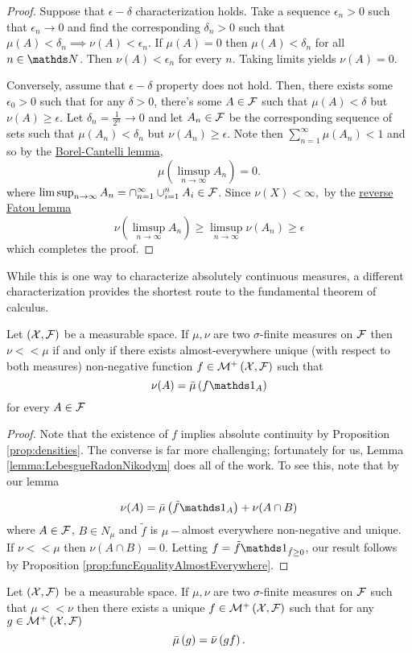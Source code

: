 \begin{proof}
Suppose that $\epsilon-\delta$ characterization holds. Take a sequence
$\epsilon_{n}>0$ such that $\epsilon_{n}\to0$ and find the corresponding
$\delta_{n}>0$ such that $\mu(A)<\delta_{n}\implies\nu(A)<\epsilon_{n}$.
If $\mu(A)=0$ then $\mu(A)<\delta_{n}$ for all $n\in\N$. Then $\nu(A)<\epsilon_{n}$
for every $n.$ Taking limits yields $\nu(A)=0.$

Conversely, assume that $\epsilon-\delta$ property does not hold.
Then, there exists some $\epsilon_{0}>0$ such that for any $\delta>0$,
there's some $A\in\mathcal{F}$ such that $\mu(A)<\delta$ but $\nu(A)\geq\epsilon$.
Let $\delta_{n}=\frac{1}{2^{n}}\to0$ and let $A_{n}\in\mathcal{F}$ be the
corresponding sequence of sets such that $\mu(A_{n})<\delta_{n}$
but $\nu(A_{n})\geq\epsilon.$ Note then $\sum_{n=1}^{\infty}\mu(A_{n})<1$
and so by the \hyperref[thm:borelCantelli]{Borel-Cantelli lemma},
\[
\mu(\limsup_{n\to\infty}A_{n})=0.
\]
where $\limsup_{n\to\infty}A_{n}=\cap_{n=1}^{\infty}\cup_{i=1}^{n}A_{i}\in\mathcal{F}$.
Since $\nu(X)<\infty,$ by the \hyperref[cor:reverseFatouLemma]{reverse Fatou lemma}
\[
\nu(\limsup_{n\to\infty}A_n)\geq\limsup_{n\to\infty}\nu(A_{n})\geq\epsilon
\]
which completes the proof.
\end{proof}
While this is one way to characterize absolutely continuous measures,
a different characterization provides the shortest route to the fundamental
theorem of calculus.
\begin{thm}
\label{thm:radonNikodym}Let $\left(\mathcal{X},\mathcal{F}\right)$ be a measurable
space. If $\mu,\nu$ are two $\sigma$-finite measures on $\mathcal{F}$ then
$\nu<<\mu$ if and only if there exists almost-everywhere unique (with
respect to both measures) non-negative function $f\in\mathcal{M}^{+}\left(\mathcal{X},\mathcal{F}\right)$
such that 
\[
\nu(A)=\lebInt{\mu}{f\indicate_{A}}
\]
for every $A\in\mathcal{F}$
\end{thm}

\begin{proof}
Note that the existence of $f$ implies absolute continuity by Proposition
\ref{prop:densities}. The converse is far more challenging; fortunately
for us, Lemma \ref{lemma:LebesgueRadonNikodym} does all of the work.
To see this, note that by our lemma

\[
\nu(A)=\lebInt{\mu}{\tilde{f}\indicate_{A}}+\nu(A\cap B)
\]
where $A\in\mathcal{F}$, $B\in N_{\mu}$ and $\tilde{f}$ is $\mu-$almost
everywhere non-negative and unique. If $\nu<<\mu$ then $\nu(A\cap B)=0$.
Letting $f=\tilde{f}\indicate_{{\tilde{f}\geq0}}$, our result follows
by Proposition \ref{prop:funcEqualityAlmostEverywhere}.
\end{proof}
\begin{cor}
\label{cor:radonNikodymIntegral}Let $\left(\mathcal{X},\mathcal{F}\right)$ be a measurable
space. If $\mu,\nu$ are two $\sigma$-finite measures on $\mathcal{F}$ such
that $\mu<<\nu$ then there exists a unique $f\in\mathcal{M}^{+}\left(\mathcal{X},\mathcal{F}\right)$
such that for any $g\in\mathcal{M}^{+}\left(\mathcal{X},\mathcal{F}\right)$ 
\[
\bar{\mu}\left(g\right)=\bar{\nu}\left(gf\right).
\]
\end{cor}

